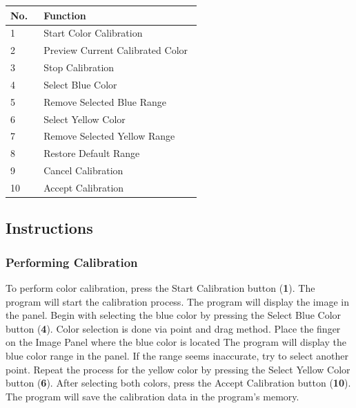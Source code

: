 \begin{table}[!ht]
    \centering
    \begin{tabular}{p{0.05\linewidth} | p{0.5\linewidth}}
        \hline
        \textbf{No.} & \textbf{Function}                \\ \hline
        1            & Start Color Calibration          \\ \hline
        2            & Preview Current Calibrated Color \\ \hline
        3            & Stop Calibration                 \\ \hline
        4            & Select Blue Color                \\ \hline
        5            & Remove Selected Blue Range       \\ \hline
        6            & Select Yellow Color              \\ \hline
        7            & Remove Selected Yellow Range     \\ \hline
        8            & Restore Default Range            \\ \hline
        9            & Cancel Calibration               \\ \hline
        10           & Accept Calibration               \\ \hline
    \end{tabular}
\end{table}


\subsection{Instructions}

\subsubsection{Performing Calibration}

To perform color calibration, press the Start Calibration button (\textbf{1}). The program will start the calibration process. The program will display the image in the panel. Begin with selecting the blue color by pressing the Select Blue Color button (\textbf{4}). Color selection is done via point and drag method. Place the finger on the Image Panel where the blue color is located The program will display the blue color range in the panel. If the range seems inaccurate, try to select another point. Repeat the process for the yellow color by pressing the Select Yellow Color button (\textbf{6}). After selecting both colors, press the Accept Calibration button (\textbf{10}). The program will save the calibration data in the program's memory.

